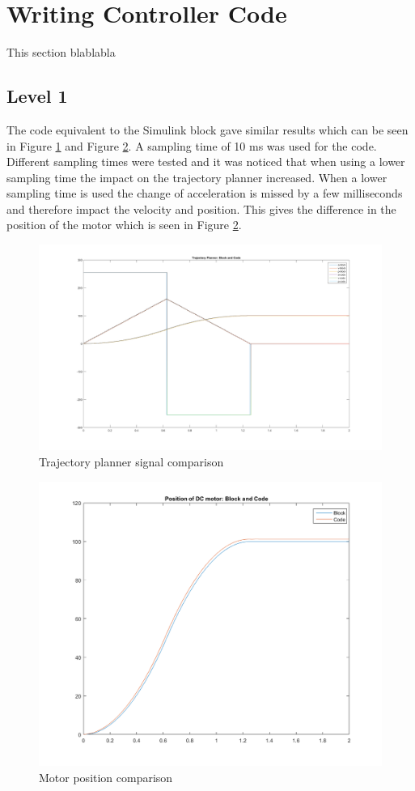 \documentclass[12pt,a4paper]{article}
\begin{document}
\section{Writing Controller Code}
This section blablabla
\subsection{Level 1}
The code equivalent to the Simulink block gave similar results which can be seen in Figure \ref{fig:task2_traj} and Figure \ref{fig:task2_pos}. A sampling time of 10 ms was used for the code. Different sampling times were tested and it was noticed that when using a lower sampling time the impact on the trajectory planner increased. When a lower sampling time is used the change of acceleration is missed by a few milliseconds and therefore impact the velocity and position. This gives the difference in the position of the motor which is seen in Figure \ref{fig:task2_pos}.
\begin{figure}[h]
	\begin{center}
	
		\includegraphics[scale=0.2]{task2_traj.png}
		\caption{Trajectory planner signal comparison}
		\label{fig:task2_traj}
	\end{center}
\end{figure}



\begin{figure}[h]
	\begin{center}
	
		\includegraphics[scale=0.2]{task2_position.png}
		\caption{Motor position comparison}
		\label{fig:task2_pos}
	\end{center}
\end{figure}
\end{document}
